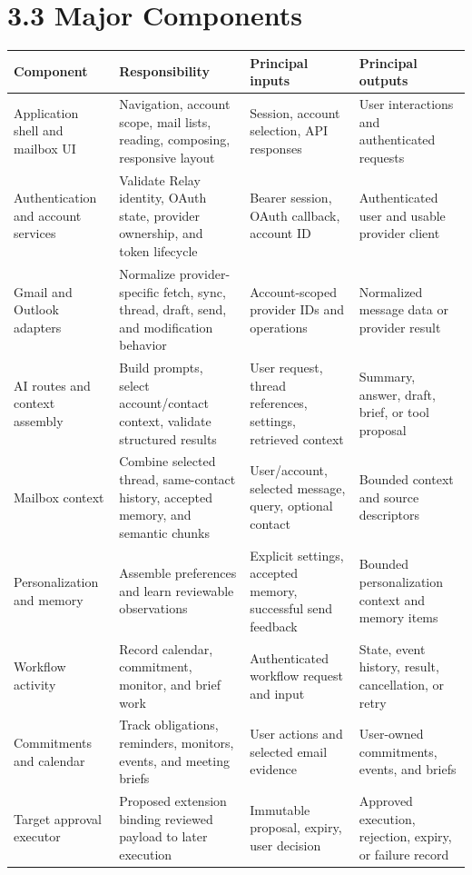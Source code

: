 \documentclass[
]{report}
\begin{document}
\section{3.3 Major Components}\label{33-major-components}

\begin{longtable}[]{@{}p{}p{}p{}p{}@{}}
\toprule\noalign{}
Component & Responsibility & Principal inputs & Principal outputs \\
\midrule\noalign{}
\endhead
\bottomrule\noalign{}
\endlastfoot
Application shell and mailbox UI & Navigation, account scope, mail
lists, reading, composing, responsive layout & Session, account
selection, API responses & User interactions and authenticated
requests \\
Authentication and account services & Validate Relay identity, OAuth
state, provider ownership, and token lifecycle & Bearer session, OAuth
callback, account ID & Authenticated user and usable provider client \\
Gmail and Outlook adapters & Normalize provider-specific fetch, sync,
thread, draft, send, and modification behavior & Account-scoped provider
IDs and operations & Normalized message data or provider result \\
AI routes and context assembly & Build prompts, select account/contact
context, validate structured results & User request, thread references,
settings, retrieved context & Summary, answer, draft, brief, or tool
proposal \\
Mailbox context & Combine selected thread, same-contact history,
accepted memory, and semantic chunks & User/account, selected message,
query, optional contact & Bounded context and source descriptors \\
Personalization and memory & Assemble preferences and learn reviewable
observations & Explicit settings, accepted memory, successful send
feedback & Bounded personalization context and memory items \\
Workflow activity & Record calendar, commitment, monitor, and brief work
& Authenticated workflow request and input & State, event history,
result, cancellation, or retry \\
Commitments and calendar & Track obligations, reminders, monitors,
events, and meeting briefs & User actions and selected email evidence &
User-owned commitments, events, and briefs \\
Target approval executor & Proposed extension binding reviewed payload
to later execution & Immutable proposal, expiry, user decision &
Approved execution, rejection, expiry, or failure record \\
\end{longtable}
\end{document}
